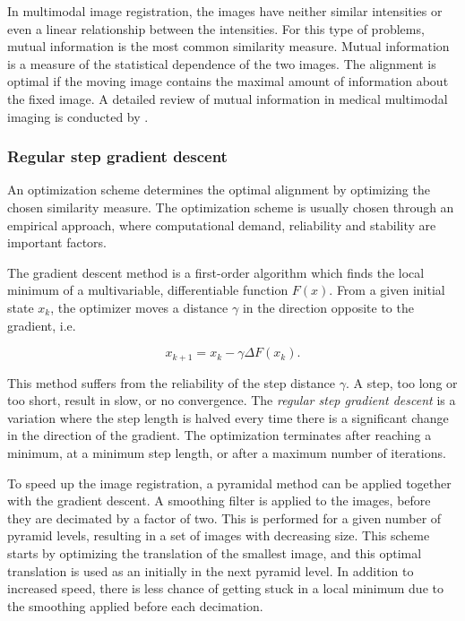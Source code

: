 In multimodal image registration, the images have neither similar intensities or even a linear relationship between the intensities. For this type of problems, mutual information is the most common similarity measure. Mutual information is a measure of the statistical dependence of the two images. The alignment is optimal if the moving image contains the maximal amount of information about the fixed image. A detailed review of mutual information in medical multimodal imaging is conducted by \citet{563664}.  

\subsubsection{Regular step gradient descent}
An optimization scheme determines the optimal alignment by optimizing the chosen similarity measure. The optimization scheme is usually chosen through an empirical approach, where computational demand, reliability and stability are important factors. 

The gradient descent method is a first-order algorithm which finds the local minimum of a multivariable, differentiable function $F(x)$. From a given initial state $x_k$, the optimizer moves a distance $\gamma$ in the direction opposite to the gradient, i.e.

\begin{equation}
\label{gradient descent}
x_{k+1} = x_k - \gamma \Delta F(x_k).
\end{equation}

This method suffers from the reliability of the step distance $\gamma$. A step, too long or too short, result in slow, or no convergence. The \textit{regular step gradient descent} is a variation where the step length is halved every time there is a significant change in the direction of the gradient. The optimization terminates after reaching a minimum, at a minimum step length, or after a maximum number of iterations.

To speed up the image registration, a pyramidal method can be applied together with the gradient descent. A smoothing filter is applied to the images, before they are decimated by a factor of two. This is performed for a given number of pyramid levels, resulting in a set of images with decreasing size. This scheme starts by optimizing the translation of the smallest image, and this optimal translation is used as an initially in the next pyramid level. In addition to increased speed, there is less chance of getting stuck in a local minimum due to the smoothing applied before each decimation.
 
